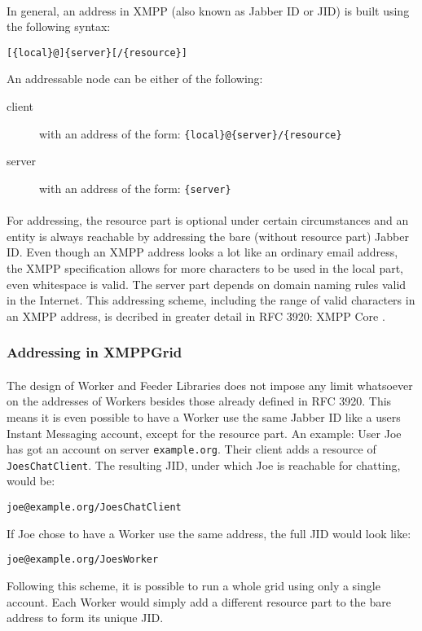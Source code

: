 \paragraph{}
In general, an address in XMPP (also known as Jabber ID or JID) is built using the following syntax:
\begin{center}
\texttt{[\{local\}@]\{server\}[/\{resource\}]}
\end{center}
An addressable node can be either of the following:
\begin{description}
\item[client] with an address of the form: \texttt{\{local\}@\{server\}/\{resource\}}
\item[server] with  an address of the form: \texttt{\{server\}}
\end{description}
\paragraph{}
For addressing, the resource part is optional under certain circumstances and an entity is always reachable by addressing the bare (without resource part) Jabber ID. Even though an XMPP address looks a lot like an ordinary email address, the XMPP specification allows for more characters to be used in the local part, even whitespace is valid. The server part depends on domain naming rules valid in the Internet. This addressing scheme, including the range of valid characters in an XMPP address, is decribed in greater detail in RFC 3920: XMPP Core \cite{xmpp-core}.

\subsubsection{Addressing in XMPPGrid}
\label{sec:addressing}
\paragraph{}
The design of Worker and Feeder Libraries does not impose any limit whatsoever on the addresses of Workers besides those already defined in RFC 3920. This means it is even possible to have a Worker use the same Jabber ID like a users Instant Messaging account, except for the resource part. An example: User Joe has got an account on server \texttt{example.org}. Their client adds a resource of \texttt{JoesChatClient}. The resulting JID, under which Joe is reachable for chatting, would be:
\begin{center}
\texttt{joe@example.org/JoesChatClient}
\end{center}
If Joe chose to have a Worker use the same address, the full JID would look like:
\begin{center}
\texttt{joe@example.org/JoesWorker}
\end{center}
Following this scheme, it is possible to run a whole grid using only a single account. Each Worker would simply add a different resource part to the bare address to form its unique JID.
